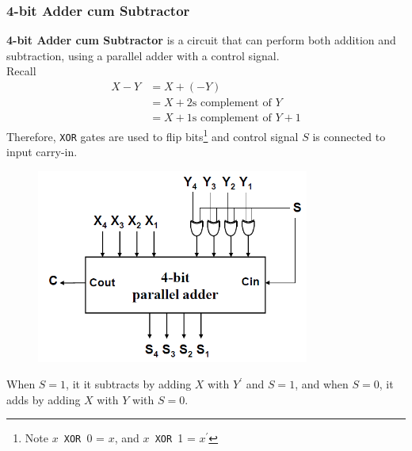 \documentclass[12pt]{article}
\theoremstyle{definition}
\begin{document}
\subsubsection{4-bit Adder cum Subtractor}
\textbf{4-bit Adder cum Subtractor} is a circuit that can perform both addition and subtraction, using a parallel adder with a control signal.\\
Recall
\begin{align*}
X-Y &=X+(-Y)\\
&=X+\text{2s complement of }Y\\
&=X+\text{1s complement of }Y + 1
\end{align*}
Therefore, \texttt{XOR} gates are used to flip bits\footnote{Note $x$\texttt{ XOR }0 = $x$, and $x$\texttt{ XOR }1 = $x^\prime$} and control signal $S$ is connected to input carry-in.
\begin{figure}[h]
\centering
\includegraphics[width = 0.8\textwidth]{6_9.png}
\end{figure}
\clearpage
When $S=1$, it it subtracts by adding $X$ with $Y^\prime$ and $S=1$, and when $S=0$, it adds by adding $X$ with $Y$ with $S=0$.
\end{document}

